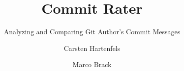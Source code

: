\documentclass{llncs}
\begin{document}
\title{Commit Rater}
\subtitle{Analyzing and Comparing Git Author's Commit Messages}
\author{Carsten Hartenfels \and Marco Brack}

\maketitle









\appendix




\end{document}
